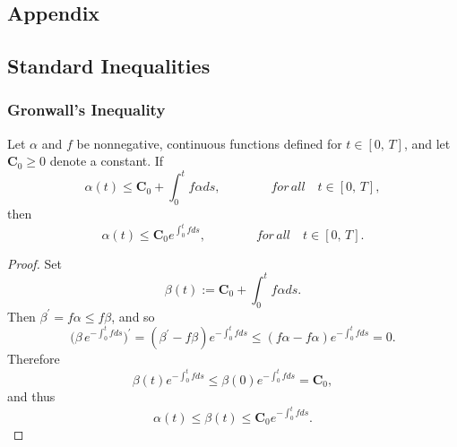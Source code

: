 \begin{appendices}
\chapter*{Appendix}
\section{Standard Inequalities}
\subsection{Gronwall's Inequality}
\begin{theorem}\label{Append_Gron_ineq}
Let $\alpha$ and $f$ be nonnegative, continuous functions defined for $t \in [0, \, T]$, and let $\mathbf{C}_0 \geq 0$ denote a constant. If
\begin{equation}
    \alpha(t) \leq \mathbf{C}_0 + \int^t_0 f \alpha ds, \qquad\qquad for \, all \quad t \in [0, \, T],
\end{equation}
then
\begin{equation}
    \alpha(t) \leq \mathbf{C}_0 e^{\int^t_0 f ds}, \qquad\qquad for \, all \quad t \in [0, \, T].
\end{equation}
\end{theorem}
\begin{proof}
Set 
\begin{equation*}
    \beta(t) :=  \mathbf{C}_0 + \int^t_0 f \alpha ds.
\end{equation*}
Then $\beta^\prime = f \alpha \leq f \beta$, and so
\begin{equation*}
    \bigg(\beta \, e^{-\int^t_0 f ds}\bigg)^\prime = (\beta^\prime - f \beta)e^{-\int^t_0 f ds} \leq (f \alpha - f \alpha)e^{-\int^t_0 f ds} = 0.
\end{equation*}
Therefore 
\begin{equation*}
    \beta (t) e^{-\int^t_0 f ds} \leq \beta (0) e^{-\int^t_0 f ds} = \mathbf{C}_0,
\end{equation*}
and thus 
\begin{equation*}
    \alpha(t) \leq \beta(t) \leq \mathbf{C}_0 e^{-\int^t_0 f ds}.
\end{equation*}
\end{proof}



\end{appendices}
